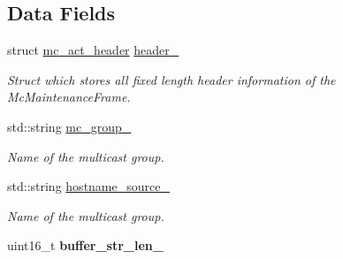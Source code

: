 \subsection*{Data Fields}
\begin{DoxyCompactItemize}
\item 
\hypertarget{classMcRouteActivationFrame_a40acfccedd076c1be9f923a8f4dbee78}{struct \hyperlink{structmc__act__header}{mc\-\_\-act\-\_\-header} \hyperlink{classMcRouteActivationFrame_a40acfccedd076c1be9f923a8f4dbee78}{header\-\_\-}}\label{classMcRouteActivationFrame_a40acfccedd076c1be9f923a8f4dbee78}

\begin{DoxyCompactList}\small\item\em Struct which stores all fixed length header information of the Mc\-Maintenance\-Frame. \end{DoxyCompactList}\item 
\hypertarget{classMcRouteActivationFrame_a5e542ea32c6d081c567ecae45b5f1412}{std\-::string \hyperlink{classMcRouteActivationFrame_a5e542ea32c6d081c567ecae45b5f1412}{mc\-\_\-group\-\_\-}}\label{classMcRouteActivationFrame_a5e542ea32c6d081c567ecae45b5f1412}

\begin{DoxyCompactList}\small\item\em Name of the multicast group. \end{DoxyCompactList}\item 
\hypertarget{classMcRouteActivationFrame_a81d1b380baec0e1f99972fadc1850643}{std\-::string \hyperlink{classMcRouteActivationFrame_a81d1b380baec0e1f99972fadc1850643}{hostname\-\_\-source\-\_\-}}\label{classMcRouteActivationFrame_a81d1b380baec0e1f99972fadc1850643}

\begin{DoxyCompactList}\small\item\em Name of the multicast group. \end{DoxyCompactList}\item 
\hypertarget{classMcRouteActivationFrame_aedadc5847e3cfa92f24aef02b019c5f1}{uint16\-\_\-t {\bfseries buffer\-\_\-str\-\_\-len\-\_\-}}\label{classMcRouteActivationFrame_aedadc5847e3cfa92f24aef02b019c5f1}

\end{DoxyCompactItemize}

